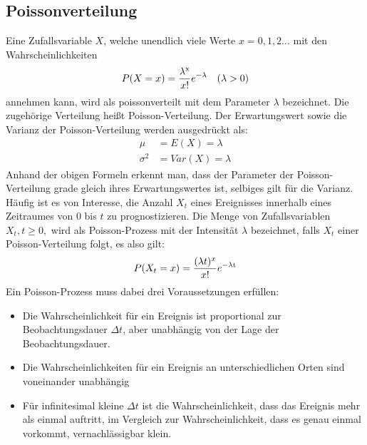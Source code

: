 \subsection{Poissonverteilung}
\label{sec.Poissonverteilung}
Eine Zufallsvariable $X$, welche unendlich viele Werte $x=0,1,2\dots$ mit den Wahrscheinlichkeiten
\begin{align}
	P(X=x) &= \frac{\lambda^{\mathrm{x}}}{x!} e^{\mathrm{-\lambda}} & (\lambda >0)
	\label{eq:Poisson Verteilung}
\end{align}
annehmen kann, wird als poissonverteilt mit dem Parameter $\lambda$ bezeichnet. Die zugehörige Verteilung heißt Poisson-Verteilung. Der Erwartungswert sowie die Varianz der Poisson-Verteilung werden ausgedrückt als:
\begin{align}
	\mu &= E(X) = \lambda \\
	\sigma^2 &= Var(X) = \lambda
	\label{eq:Poisson EW und Var}
\end{align}
Anhand der obigen Formeln erkennt man, dass der Parameter der Poisson-Verteilung grade gleich ihres Erwartungswertes ist, selbiges gilt für die Varianz.
Häufig ist es von Interesse, die Anzahl $X_t$ eines Ereignisses innerhalb eines Zeitraumes von 0 bis $t$ zu prognostizieren. Die Menge von Zufallsvariablen $X_t, t\geq 0,$ wird als Poisson-Prozess mit der Intensität $\lambda$ bezeichnet, falls $X_t$ einer Poisson-Verteilung folgt, es also gilt: \\
\begin{equation}
	P(X_t=x) = \frac{(\lambda t)^x}{x!} e^{\mathrm{-\lambda t}}
	\label{eq:Poisson-Prozess}
\end{equation}
Ein Poisson-Prozess muss dabei drei Voraussetzungen erfüllen:
\begin{itemize}
	\item Die Wahrscheinlichkeit für ein Ereignis ist proportional zur Beobachtungsdauer $\Delta t$, aber unabhängig von der Lage der Beobachtungsdauer.
	\item Die Wahrscheinlichkeiten für ein Ereignis an unterschiedlichen Orten sind voneinander unabhängig
	\item Für infinitesimal kleine $\Delta t$ ist die Wahrscheinlichkeit, dass das Ereignis mehr als einmal auftritt, im Vergleich zur Wahrscheinlichkeit, dass es genau einmal vorkommt, vernachlässigbar klein.
\end{itemize}



